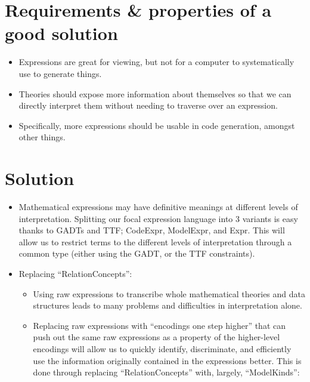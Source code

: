 \section{Requirements \& properties of a good solution}

\begin{itemize}

	\item Expressions are great for viewing, but not for a computer to
	      systematically use to generate things.

	\item Theories should expose more information about themselves so that
	      we can directly interpret them without needing to traverse over
	      an expression.

	\item Specifically, more expressions should be usable in code generation,
	      amongst other things.

\end{itemize}

\section{Solution}

\begin{itemize}

	\item Mathematical expressions may have definitive meanings
	      at different levels of interpretation. Splitting our
	      focal expression language into 3 variants is easy
	      thanks to GADTs and TTF; CodeExpr, ModelExpr, and Expr.
	      This will allow us to restrict terms to the different
	      levels of interpretation through a common type (either
	      using the GADT, or the TTF constraints).

	\item Replacing ``RelationConcepts'':

	      \begin{itemize}

		      \item Using raw expressions to transcribe whole mathematical
		            theories and data structures leads to many problems
		            and difficulties in interpretation alone.

		      \item Replacing raw expressions with ``encodings one step
		            higher'' that can push out the same raw expressions
		            as a property of the higher-level encodings will
		            allow us to quickly identify, discriminate, and efficiently
		            use the information originally contained in the expressions
		            better. This is done through replacing ``RelationConcepts''
		            with, largely, ``ModelKinds'':

	      \end{itemize}

\end{itemize}

